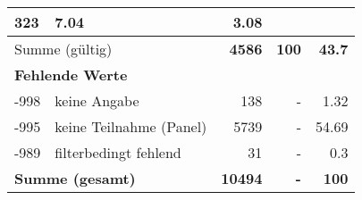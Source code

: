 \begin{longtable}{lXrrr}
       \num{323} &
       \num[round-mode=places,round-precision=2]{7,04} &
         \num[round-mode=places,round-precision=2]{3,08} \\
     \midrule
     \multicolumn{2}{l}{Summe (gültig)} &
       \textbf{\num{4586}} &
     \textbf{100} &
       \textbf{\num[round-mode=places,round-precision=2]{43,7}} \\
     \multicolumn{5}{l}{\textbf{Fehlende Werte}}\\
       -998 &
       keine Angabe &
         \num{138} &
        - &
         \num[round-mode=places,round-precision=2]{1,32} \\
       -995 &
       keine Teilnahme (Panel) &
         \num{5739} &
        - &
         \num[round-mode=places,round-precision=2]{54,69} \\
       -989 &
       filterbedingt fehlend &
         \num{31} &
        - &
         \num[round-mode=places,round-precision=2]{0,3} \\
     \midrule
     \multicolumn{2}{l}{\textbf{Summe (gesamt)}} &
          \textbf{\num{10494}} &
        \textbf{-} &
        \textbf{100} \\
     \bottomrule
     \end{longtable}
     
